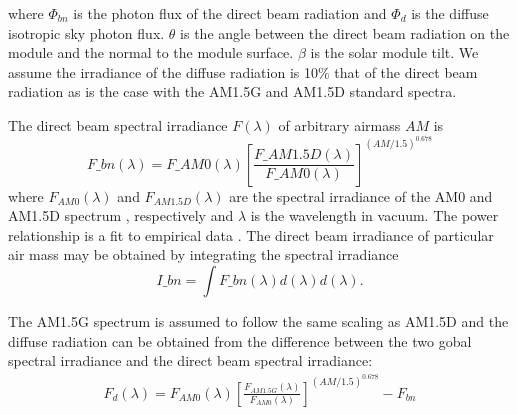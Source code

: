 \documentclass[preprint,12pt]{elsarticle}
\begin{document}



where $\Phi_{bn}$ is the photon flux of the direct beam radiation and 
$\Phi_d$ is the diffuse isotropic sky photon flux.  
$\theta$ is the angle between the direct beam radiation on the module and the normal to
the module surface. $\beta$ is the solar module tilt.  
We assume the irradiance of the diffuse radiation is 10\% that of the direct beam radiation
as is the case with the AM1.5G and AM1.5D standard spectra. 

The direct beam spectral irradiance $F(\lambda)$ of arbitrary airmass $AM$ is 
\begin{equation}
F\_{bn} (\lambda) = F\_{AM0} (\lambda) \left [ \frac{F\_{AM1.5D} (\lambda)}{F\_{AM0} (\lambda)}  \right ] ^{ \left ( AM/1.5 \right )^{0.678}}
\end{equation}
where $F_{AM0}(\lambda)$
and $F_{AM1.5D}(\lambda)$ are 
the spectral irradiance of the AM0 and AM1.5D spectrum \cite{AM1p5}, respectively and $\lambda$ is the wavelength in vacuum. 
The power relationship is a  fit to empirical data \cite{Meinel:76}.
The direct beam irradiance of particular air mass may be obtained by integrating the spectral irradiance
\begin{equation}
I\_{bn} = \int F\_{bn} (\lambda) d (\lambda) d (\lambda)
\label{eq:IAMDb}.
\end{equation}

The AM1.5G spectrum is assumed to follow the same scaling as AM1.5D and the diffuse radiation can be obtained from the difference between the two gobal spectral irradiance and the direct beam spectral irradiance:
\begin{align}
F_{d} (\lambda) = F_{AM0} (\lambda) 
 \left [ \frac{F_{AM1.5G} (\lambda)}{F_{AM0} (\lambda)}  \right ] ^ {\left ( AM/1.5 \right ) ^{0.678}} - 
F_{bn} 
\end{align}
\end{document}
